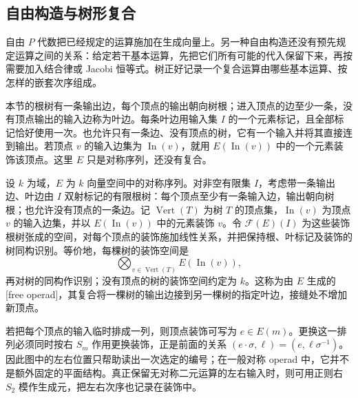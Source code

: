 \subsection{自由构造与树形复合}
\label{b4:subsec:G01:03}

自由 \(P\) 代数把已经规定的运算施加在生成向量上。另一种自由构造还没有预先规定运算之间的关系：给定若干基本运算，先把它们所有可能的代入保留下来，再按需要加入结合律或 Jacobi 恒等式。树正好记录一个复合运算由哪些基本运算、按怎样的嵌套次序组成。

\ProseParagraphBreak
本节的根树有一条输出边，每个顶点的输出朝向树根；进入顶点的边至少一条，没有顶点输出的输入边称为叶边。每条叶边用输入集 \(I\) 的一个元素标记，且全部标记恰好使用一次。也允许只有一条边、没有顶点的树，它有一个输入并将其直接连到输出。若顶点 \(v\) 的输入边集为 \(\operatorname{In}(v)\)，就用 \(E(\operatorname{In}(v))\) 中的一个元素装饰该顶点。这里 \(E\) 只是对称序列，还没有复合。

\begin{definition}\label{b4:def:tree-free-operad}
	设 \(k\) 为域，\(E\) 为 \(k\) 向量空间中的对称序列。对非空有限集 \(I\)，考虑带一条输出边、叶边由 \(I\) 双射标记的有限根树：每个顶点至少有一条输入边，输出朝向树根；也允许没有顶点的一条边。记 \(\operatorname{Vert}(T)\) 为树 \(T\) 的顶点集，\(\operatorname{In}(v)\) 为顶点 \(v\) 的输入边集，并以 \(E(\operatorname{In}(v))\) 中的元素装饰 \(v\)。令 \(\mathcal F(E)(I)\) 为这些装饰根树张成的空间，对每个顶点的装饰施加线性关系，并把保持根、叶标记及装饰的树同构识别。等价地，每棵树的装饰空间是
	\[
		\bigotimes_{v\in\operatorname{Vert}(T)}E(\operatorname{In}(v)),
	\]
	再对树的同构作识别；没有顶点的树的装饰空间约定为 \(k\)。这称为由 \(E\) 生成的[free operad]，其复合将一棵树的输出边接到另一棵树的指定叶边，接缝处不增加新顶点。
\end{definition}

若把每个顶点的输入临时排成一列，则顶点装饰可写为 \(e\in E(m)\)。更换这一排列必须同时按右 \(S_m\) 作用更换装饰，正是前面的关系 \((e\cdot\sigma,\ell)=(e,\ell\sigma^{-1})\)。因此图中的左右位置只帮助读出一次选定的编号；在一般对称 operad 中，它并不是额外固定的平面结构。真正保留无对称二元运算的左右输入时，则可用正则右 \(S_2\) 模作生成元，把左右次序也记录在装饰中。

